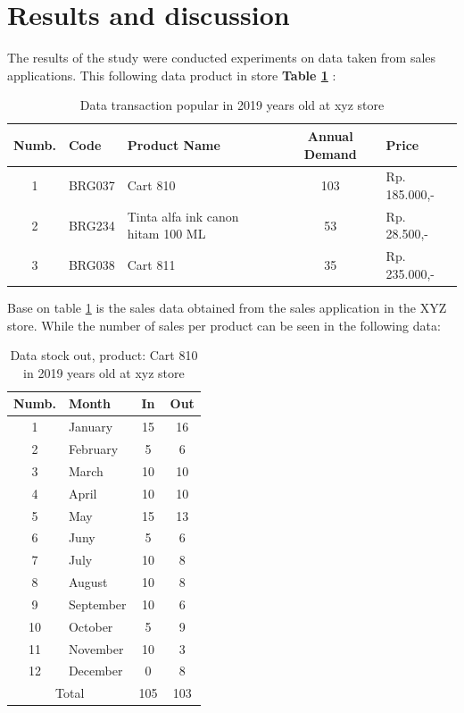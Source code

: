 \documentclass[12pt,a4paper,final]{iopart}
\begin{document}
\section{Results and discussion}
The results of the study were conducted experiments on data taken from sales applications. This following data product in store \textbf{Table \ref{tableBarang}} :
\begin{table}[h!]
	\centering
	\caption{\label{tableBarang} Data transaction popular in 2019 years old at xyz store}
	\begin{tabular}{ cllcl }
		\hline
		\textbf{Numb.} & \textbf{Code} & \textbf{Product Name} & \textbf{Annual Demand} & \textbf{Price} \\
		\hline
		1 & BRG037 & Cart 810 & 103 & Rp. 185.000,-  \\ 
		2 & BRG234 & Tinta alfa ink canon hitam 100 ML & 53 &  Rp. 28.500,-  \\ 
		3 & BRG038 & Cart 811 & 35 & Rp. 235.000,- \\ 
		\hline
	\end{tabular}
\end{table}

Base on table \ref{tableBarang} is the sales data obtained from the sales application in the XYZ store. While the number of sales per product can be seen in the following data:
\begin{center}
	\begin{longtable}{ clcc }
		\caption{\label{tableOut} Data stock out, product: Cart 810 in 2019 years old at xyz store}\\
		\hline
		\textbf{Numb.} & \textbf{Month} & \textbf{In} & \textbf{Out} \\
		\hline
		1 & January & 15 & 16  \\ 
		2 & February & 5 & 6  \\ 
		3 & March & 10 & 10 \\ 
		4 & April & 10 & 10 \\ 
		5 & May & 15 & 13 \\ 
		6 & Juny & 5 & 6 \\ 
		7 & July & 10 & 8 \\ 
		8 & August & 10 & 8 \\ 
		9 & September & 10 & 6 \\ 
		10 & October & 5 & 9 \\ 
		11 & November & 10 & 3 \\ 
		12 & December & 0 & 8 \\ 
		\hline
		\multicolumn{2}{c}{Total} & {105} & {103}\\
		\hline
	\end{longtable}
\end{center}
\end{document}
